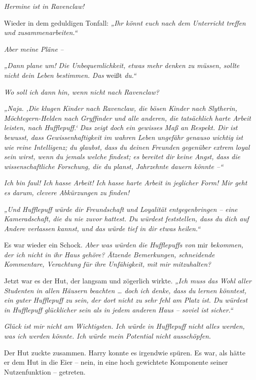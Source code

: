 \emph{Hermine ist in Ravenclaw!} 

Wieder in dem geduldigen Tonfall: \emph{„Ihr könnt euch nach dem Unterricht treffen und zusammenarbeiten.“ }

\emph{Aber meine Pläne – }

\emph{„Dann plane um! Die Unbequemlichkeit, etwas mehr denken zu müssen, sollte nicht dein Leben bestimmen. Das }weißt\emph{ du.“ }

\emph{Wo soll ich dann hin, wenn nicht nach Ravenclaw? }

\emph{„Naja. ‚Die klugen Kinder nach Ravenclaw, die bösen Kinder nach Slytherin, Möchtegern-Helden nach Gryffinder und alle anderen, die tatsächlich harte Arbeit leisten, nach Hufflepuff.‘ Das zeigt doch ein gewisses Maß an Respekt. Dir ist bewusst, dass Gewissenhaftigkeit im wahren Leben ungefähr genauso wichtig ist wie reine Intelligenz; du glaubst, dass du deinen Freunden gegenüber extrem loyal sein wirst, wenn du jemals welche findest; es bereitet dir keine Angst, dass die wissenschaftliche Forschung, die du planst, Jahrzehnte dauern könnte –“}

\emph{Ich bin faul! Ich hasse Arbeit! Ich hasse harte Arbeit in jeglicher Form! Mir geht es darum, clevere Abkürzungen zu finden! }

\emph{„Und Hufflepuff würde dir Freundschaft und Loyalität entgegenbringen – eine Kameradschaft, die du nie zuvor hattest. Du würdest feststellen, dass du dich auf Andere verlassen kannst, und das würde tief in dir etwas heilen.“} 

Es war wieder ein Schock. \emph{Aber was würden die Hufflepuffs von }mir\emph{ bekommen, der ich nicht in ihr Haus gehöre? Ätzende Bemerkungen, schneidende Kommentare, Verachtung für ihre Unfähigkeit, mit mir mitzuhalten?} 

Jetzt war es der Hut, der langsam und zögerlich wirkte. \emph{„Ich muss das Wohl aller Studenten in allen Häusern beachten … doch ich denke, dass du lernen könntest, ein guter Hufflepuff zu sein, der dort nicht zu sehr fehl am Platz ist. Du würdest in Hufflepuff glücklicher sein als in jedem anderen Haus – soviel ist sicher.“ }

\emph{Glück ist mir nicht am Wichtigsten. Ich würde in Hufflepuff nicht alles werden, was ich werden könnte. Ich würde mein Potential nicht ausschöpfen.} 

Der Hut zuckte zusammen. Harry konnte es irgendwie spüren. Es war, als hätte er dem Hut in die Eier – nein, in eine hoch gewichtete Komponente seiner Nutzenfunktion – getreten. 

